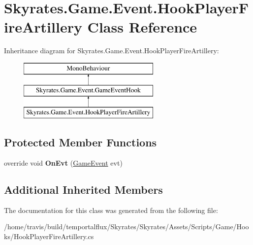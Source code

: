 \hypertarget{class_skyrates_1_1_game_1_1_event_1_1_hook_player_fire_artillery}{\section{Skyrates.\-Game.\-Event.\-Hook\-Player\-Fire\-Artillery Class Reference}
\label{class_skyrates_1_1_game_1_1_event_1_1_hook_player_fire_artillery}
}
Inheritance diagram for Skyrates.\-Game.\-Event.\-Hook\-Player\-Fire\-Artillery\-:\begin{figure}[H]
\begin{center}
\leavevmode
\includegraphics[height=3.000000cm]{class_skyrates_1_1_game_1_1_event_1_1_hook_player_fire_artillery}
\end{center}
\end{figure}
\subsection*{Protected Member Functions}
\begin{DoxyCompactItemize}
\item 
\hypertarget{class_skyrates_1_1_game_1_1_event_1_1_hook_player_fire_artillery_a58f3d57a8dde58e81bbe37877df9aafb}{override void {\bfseries On\-Evt} (\hyperlink{class_skyrates_1_1_game_1_1_event_1_1_game_event}{Game\-Event} evt)}\label{class_skyrates_1_1_game_1_1_event_1_1_hook_player_fire_artillery_a58f3d57a8dde58e81bbe37877df9aafb}

\end{DoxyCompactItemize}
\subsection*{Additional Inherited Members}


The documentation for this class was generated from the following file\-:\begin{DoxyCompactItemize}
\item 
/home/travis/build/temportalflux/\-Skyrates/\-Skyrates/\-Assets/\-Scripts/\-Game/\-Hooks/Hook\-Player\-Fire\-Artillery.\-cs\end{DoxyCompactItemize}
